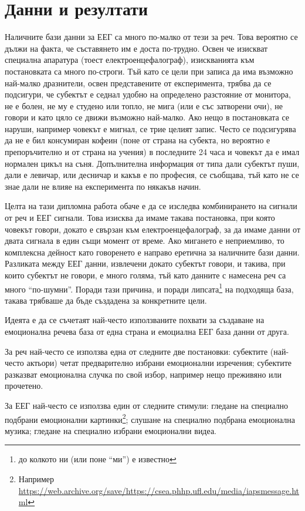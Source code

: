 \documentclass[main.tex]{subfiles}
\begin{document}
\section{Данни и резултати}

Наличните бази данни за ЕЕГ са много по-малко от тези за реч. Това вероятно се дължи на факта, че съставянето им е доста по-трудно. Освен че изискват специална апаратура (тоест електроенцефалограф), изискванията към постановката са много по-строги. Тъй като се цели при записа да има възможно най-малко дразнители, освен представените от експеримента, трябва да се подсигури, че субектът е седнал удобно на определено разстояние от монитора, не е болен, не му е студено или топло, не мига (или е със затворени очи), не говори и като цяло се движи възможно най-малко. Ако нещо в постановката се наруши, например човекът е мигнал, се трие целият запис. Често се подсигурява да не е бил консумиран кофеин (поне от страна на субекта, но вероятно е препоръчително и от страна на учения) в последните 24 часа и човекът да е имал нормален цикъл на съня. Допълнителна информация от типа дали субектът пуши, дали е левичар, или десничар и какъв е по професия, се съобщава, тъй като не се знае дали не влияе на експеримента по някакъв начин. 

Целта на тази дипломна работа обаче е да се изследва комбинирането на сигнали от реч и ЕЕГ сигнали. Това изисква да имаме такава постановка, при която човекът говори, докато е свързан към електроенцефалограф, за да имаме данни от двата сигнала в един същи момент от време. Ако мигането е неприемливо, то комплексна дейност като говоренето е направо еретична за наличните бази данни. Разликата между ЕЕГ данни, извлечени докато субектът говори, и такива, при които субектът не говори, е много голяма, тъй като данните с намесена реч са много ``по-шумни''. Поради тази причина, и поради липсата\footnote{до колкото ни (или поне ``ми'') е известно} на подходяща база, такава трябваше да бъде създадена за конкретните цели.

Идеята е да се съчетаят най-често използваните похвати за създаване на емоционална речева база от една страна и емоциална ЕЕГ база данни от друга.

За реч най-често се използва една от следните две постановки: субектите (най-често актьори) четат предварително избрани емоционални изречения; субектите разказват емоционална случка по свой избор, например нещо преживяно или прочетено.

За ЕЕГ най-често се използва един от следните стимули: гледане на специално подбрани емоционални картинки\footnote{Например \url{https://web.archive.org/save/https://csea.phhp.ufl.edu/media/iapsmessage.html}}; слушане на специално подбрана емоционална музика; гледане на специално избрани емоционални видеа.
\end{document}
